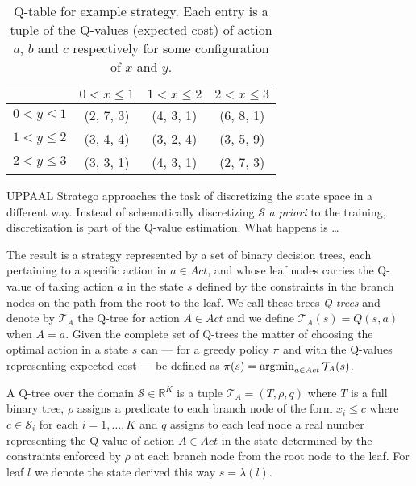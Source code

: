 \begin{table}[htpb]
    \centering
    \caption{%
        Q-table for example strategy. Each entry is a tuple of the Q-values
        (expected cost) of action $a$, $b$ and $c$ respectively for some
        configuration of $x$ and $y$.
    }\label{tab:exStrategyQTable}
    \begin{tabular}{l@{\quad}c@{\quad}c@{\quad}c}
        \toprule
         & $0 < x \le 1$ & $1 < x \le 2$ & $2 < x \le 3$ \\
        \midrule
        $0 < y \le 1$ & (2, 7, 3) & (4, 3, 1) & (6, 8, 1) \\
        $1 < y \le 2$  & (3, 4, 4) & (3, 2, 4) & (3, 5, 9) \\
        $2 < y \le 3$  & (3, 3, 1) & (4, 3, 1) & (2, 7, 3) \\
        \bottomrule
    \end{tabular}
\end{table}

UPPAAL Stratego approaches the task of discretizing the state space in a
different way. Instead of schematically discretizing $\mathcal{S}$ \textit{a
priori} to the training, discretization is part of the Q-value estimation. What
happens is \ldots{}

The result is a strategy represented by a set of binary decision trees, each
pertaining to a specific action in $a \in Act$, and whose leaf nodes carries the
Q-value of taking action $a$ in the state $s$ defined by the constraints in the
branch nodes on the path from the root to the leaf. We call these trees
\textit{Q-trees} and denote by $\mathcal{T}_A$ the Q-tree for action $A \in Act$
and we define $\mathcal{T}_A(s) = Q(s,a)$ when $A=a$. Given the complete set of Q-trees
the matter of choosing the optimal action in a state $s$ can --- for a greedy
policy $\pi$ and with the Q-values representing expected cost --- be defined as
$\pi(s) = \operatorname*{argmin}_{a\in Act} \mathcal{T}_A(s)$.

\begin{definition}[Q-tree]%
\label{def:qTree}
    A Q-tree over the domain $\mathcal{S} \in \mathbb{R}^K$ is a tuple
    $\mathcal{T}_A = (T, \rho, q)$ where $T$ is a full binary tree, $\rho$
    assigns a predicate to each branch node of the form $x_i \le c$ where $c \in
    \mathcal{S}_i$ for each $i = 1, \ldots, K$ and $q$ assigns to each leaf node
    a real number representing the Q-value of action $A \in Act$ in the state
    determined by the constraints enforced by $\rho$ at each branch node from
    the root node to the leaf. For leaf $l$ we denote the state derived this way
    $s = \lambda(l)$.
\end{definition}


